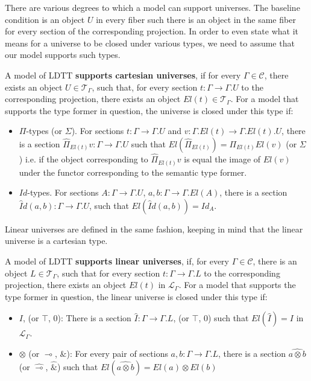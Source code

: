 There are various degrees to which a model can support universes. The baseline condition is an object $U$ in every fiber such there is an object in the same fiber for every section of the corresponding projection. In order to even state what it means for a universe to be closed under various types, we need to assume that our model supports such types.
\begin{defn}A model of LDTT \textbf{supports cartesian universes}, if for every $\Gamma \in \mathcal{C}$, there exists an object $U \in \mathcal{T}_{\Gamma}$, such that, for every section $t : \Gamma \to \Gamma.U$ to the corresponding projection, there exists an object $El(t) \in \mathcal{T}_{\Gamma}$. For a model that supports the type former in question, the universe is closed under this type if:
  \begin{itemize}
  \item $\Pi$-types (or $\Sigma$). For sections $t : \Gamma \to \Gamma.U$ and $v : \Gamma.El(t) \to \Gamma.El(t).U$, there is a section $\hat \Pi_{El(t)}v : \Gamma \to \Gamma.U$ such that $El(\hat \Pi_{El(t)}) = \Pi_{El(t)}El(v)$ (or $\Sigma$) i.e. if the object corresponding to $\hat \Pi_{El(t)}v$ is equal the image of $El(v)$ under the functor corresponding to the semantic type former.
  \item $Id$-types. For sections $A : \Gamma \to \Gamma.U$, $a, b : \Gamma \to \Gamma.El(A)$, there is a section $\hat Id(a, b) : \Gamma \to \Gamma.U$, such that $El(\hat Id(a, b)) = Id_A$.
  \end{itemize}
\end{defn}
Linear universes are defined in the same fashion, keeping in mind that the linear universe is a cartesian type.
\begin{defn}
  A model of LDTT \textbf{supports linear universes}, if, for every $\Gamma \in \mathcal{C}$, there is an object $L \in \mathcal{T}_{\Gamma}$, such that for every section $t : \Gamma \to \Gamma.L$ to the corresponding projection, there exists an object $El(t)$ in $\mathcal{L}_{\Gamma}$. For a model that supports the type former in question, the linear universe is closed under this type if:
  \begin{itemize}
    \item $I$, (or $\top$, $0$): There is a section $\hat I : \Gamma \to \Gamma.L$, (or $\top$, $0$) such that $El(\hat I) = I$ in $\mathcal{L}_\Gamma$.
    \item $\otimes$ (or $\multimap$, $\&$): For every pair of sections $a, b : \Gamma \to \Gamma.L$, there is a section $\hat{a\otimes b}$ (or $\hat \multimap$, $\hat \&$) such that $El(\hat{a\otimes b}) = El(a)\otimes El(b)$
    \end{itemize}
  \end{defn}
